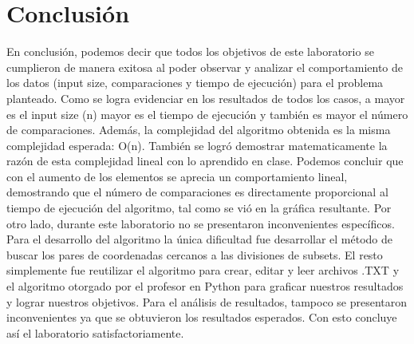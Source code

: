 \section{Conclusión}
En conclusión, podemos decir que todos los objetivos de este laboratorio se cumplieron de manera exitosa al poder observar y analizar el comportamiento de los datos (input size, comparaciones y tiempo de ejecución) para el problema planteado. Como se logra evidenciar en los resultados de todos los casos, a mayor es el input size (n) mayor es el tiempo de ejecución y también es mayor el número de comparaciones. Además, la complejidad del algoritmo obtenida es la misma complejidad esperada: O(n). También se logró demostrar matematicamente la razón de esta complejidad lineal con lo aprendido en clase. Podemos concluir que con el aumento de los elementos se aprecia un comportamiento lineal, demostrando que el número de comparaciones es directamente proporcional al tiempo de ejecución del algoritmo, tal como se vió en la gráfica resultante. Por otro lado, durante este laboratorio no se presentaron inconvenientes específicos. Para el desarrollo del algoritmo la única dificultad fue desarrollar el método de buscar los pares de coordenadas cercanos a las divisiones de subsets. El resto simplemente fue reutilizar el algoritmo para crear, editar y leer archivos .TXT y el algoritmo otorgado por el profesor en Python para graficar nuestros resultados y lograr nuestros objetivos. Para el análisis de resultados, tampoco se presentaron inconvenientes ya que se obtuvieron los resultados esperados. Con esto concluye así el laboratorio satisfactoriamente.
